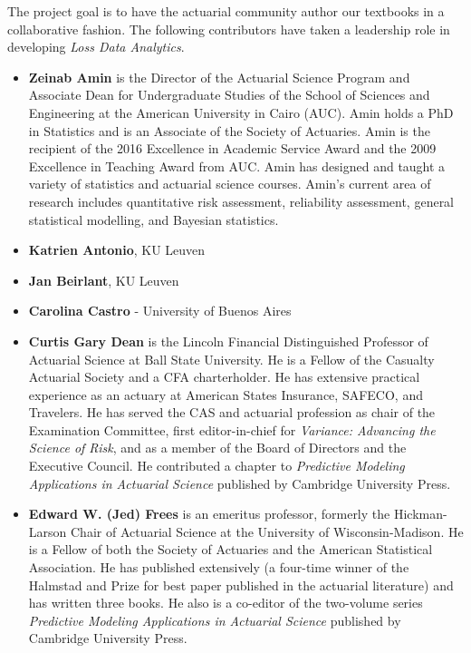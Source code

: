 \documentclass[]{book}
\providecommand{\tightlist}{%
  \setlength{\itemsep}{0pt}\setlength{\parskip}{0pt}}
\theoremstyle{definition}
\theoremstyle{definition}
\theoremstyle{definition}
\theoremstyle{remark}
\begin{document}
The project goal is to have the actuarial community author our textbooks
in a collaborative fashion. The following contributors have taken a
leadership role in developing \emph{Loss Data Analytics}.

\begin{itemize}
\item
  \textbf{Zeinab Amin} is the Director of the Actuarial Science Program
  and Associate Dean for Undergraduate Studies of the School of Sciences
  and Engineering at the American University in Cairo (AUC). Amin holds
  a PhD in Statistics and is an Associate of the Society of Actuaries.
  Amin is the recipient of the 2016 Excellence in Academic Service Award
  and the 2009 Excellence in Teaching Award from AUC. Amin has designed
  and taught a variety of statistics and actuarial science courses.
  Amin's current area of research includes quantitative risk assessment,
  reliability assessment, general statistical modelling, and Bayesian
  statistics.
\item
  \textbf{Katrien Antonio}, KU Leuven
\item
  \textbf{Jan Beirlant}, KU Leuven
\item
  \textbf{Carolina Castro} - University of Buenos Aires
\end{itemize}

\begin{itemize}
\tightlist
\item
  \textbf{Curtis Gary Dean} is the Lincoln Financial Distinguished
  Professor of Actuarial Science at Ball State University. He is a
  Fellow of the Casualty Actuarial Society and a CFA charterholder. He
  has extensive practical experience as an actuary at American States
  Insurance, SAFECO, and Travelers. He has served the CAS and actuarial
  profession as chair of the Examination Committee, first
  editor-in-chief for \emph{Variance: Advancing the Science of Risk},
  and as a member of the Board of Directors and the Executive Council.
  He contributed a chapter to \emph{Predictive Modeling Applications in
  Actuarial Science} published by Cambridge University Press.
\end{itemize}

\begin{itemize}
\tightlist
\item
  \textbf{Edward W. (Jed) Frees} is an emeritus professor, formerly the
  Hickman-Larson Chair of Actuarial Science at the University of
  Wisconsin-Madison. He is a Fellow of both the Society of Actuaries and
  the American Statistical Association. He has published extensively (a
  four-time winner of the Halmstad and Prize for best paper published in
  the actuarial literature) and has written three books. He also is a
  co-editor of the two-volume series \emph{Predictive Modeling
  Applications in Actuarial Science} published by Cambridge University
  Press.
\end{itemize}
\end{document}

